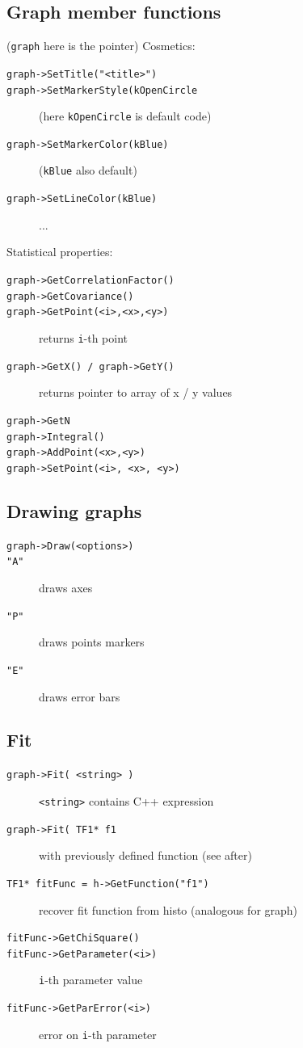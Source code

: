 \documentclass[10pt, oneside]{article}
\begin{document}
\subsection{Graph member functions}
(\texttt{graph} here is the pointer)
Cosmetics:
\begin{description}
\item[\texttt{graph->SetTitle("<title>")}]
\item[\texttt{graph->SetMarkerStyle(kOpenCircle}] (here \texttt{kOpenCircle} is default code)
\item[\texttt{graph->SetMarkerColor(kBlue)}] (\texttt{kBlue} also default)
\item[\texttt{graph->SetLineColor(kBlue)}] ...
\end{description}
Statistical properties:
\begin{description}
\item[\texttt{graph->GetCorrelationFactor()}]
\item[\texttt{graph->GetCovariance()}]
\item[\texttt{graph->GetPoint(<i>,<x>,<y>)}] returns \texttt{i}-th point
\item[\texttt{graph->GetX() / graph->GetY()}] returns pointer to array of x / y values
\item[\texttt{graph->GetN}]
\item[\texttt{graph->Integral()}]
\item[\texttt{graph->AddPoint(<x>,<y>)}]
\item[\texttt{graph->SetPoint(<i>, <x>, <y>)}]
\end{description}

\subsection{Drawing graphs}
\begin{description}
\item[\texttt{graph->Draw(<options>)}]
\item[\texttt{"A"}] draws axes
\item[\texttt{"P"}] draws points markers
\item[\texttt{"E"}] draws error bars
\end{description}

\subsection{Fit}
\begin{description}
\item[\texttt{graph->Fit( <string> )}] \texttt{<string>} contains C++ expression
\item[\texttt{graph->Fit( TF1* f1 }] with previously defined function (see after)
\item[\texttt{TF1* fitFunc = h->GetFunction("f1")}] recover fit function from histo (analogous for graph)
\item[\texttt{fitFunc->GetChiSquare()}]
\item[\texttt{fitFunc->GetParameter(<i>)}] \texttt{i}-th parameter value
\item[\texttt{fitFunc->GetParError(<i>)}] error on \texttt{i}-th parameter
\end{description}
\end{document}

